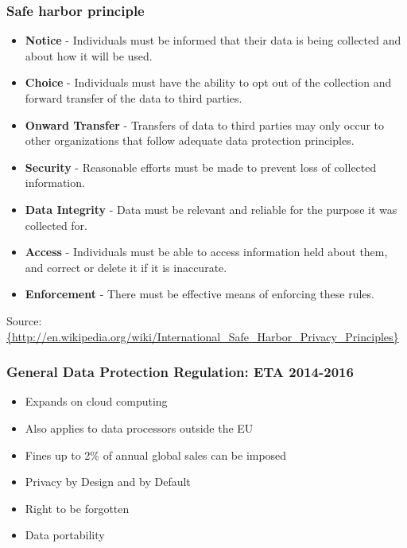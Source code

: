 \documentclass{beamer}
\begin{document}
\begin{frame}
    \frametitle{Safe harbor principle}
    \begin{scriptsize}
    \begin{itemize}
        \item \textbf{Notice} - Individuals must be informed that their data is being collected and about how it will be used.
        \item \textbf{Choice} - Individuals must have the ability to opt out of the collection and forward transfer of the data to third parties.
        \item \textbf{Onward Transfer} - Transfers of data to third parties may only occur to other organizations that follow adequate data protection principles.
        \item \textbf{Security} - Reasonable efforts must be made to prevent loss of collected information.
        \item \textbf{Data Integrity} - Data must be relevant and reliable for the purpose it was collected for.
        \item \textbf{Access} - Individuals must be able to access information held about them, and correct or delete it if it is inaccurate.
        \item \textbf{Enforcement} - There must be effective means of enforcing these rules.
    \end{itemize}
    \end{scriptsize}
    \footnotesize{Source: \url{{http://en.wikipedia.org/wiki/International_Safe_Harbor_Privacy_Principles}}}
\end{frame}

\begin{frame}
    \frametitle{General Data Protection Regulation: ETA 2014-2016}
    \begin{itemize}
    \item Expands on cloud computing
    \item Also applies to data processors outside the EU
    \item Fines up to 2\% of annual global sales can be imposed
    \end{itemize}

    \begin{itemize}
    \item Privacy by Design and by Default
    \item Right to be forgotten
    \item Data portability
    \end{itemize}
\end{frame}
\end{document}
